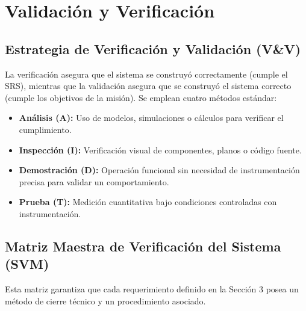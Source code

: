 \section{Validación y Verificación}

\subsection{Estrategia de Verificación y Validación (V\&V)}
La verificación asegura que el sistema se construyó correctamente (cumple el SRS), mientras que la validación asegura que se construyó el sistema correcto (cumple los objetivos de la misión). Se emplean cuatro métodos estándar:

\begin{itemize}
    \item \textbf{Análisis (A):} Uso de modelos, simulaciones o cálculos para verificar el cumplimiento.
    \item \textbf{Inspección (I):} Verificación visual de componentes, planos o código fuente.
    \item \textbf{Demostración (D):} Operación funcional sin necesidad de instrumentación precisa para validar un comportamiento.
    \item \textbf{Prueba (T):} Medición cuantitativa bajo condiciones controladas con instrumentación.
\end{itemize}

\subsection{Matriz Maestra de Verificación del Sistema (SVM)}
Esta matriz garantiza que cada requerimiento definido en la Sección 3 posea un método de cierre técnico y un procedimiento asociado.

